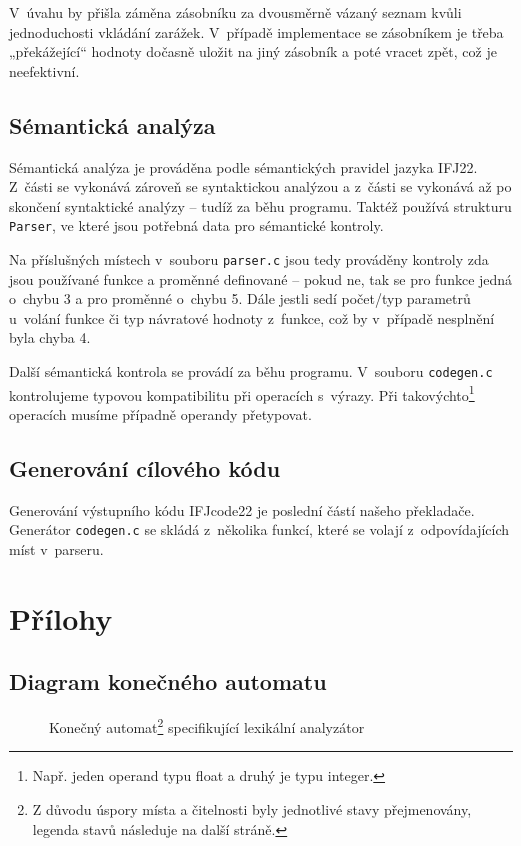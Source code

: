 \documentclass[a4paper,12pt]{article}
\begin{document}
V~úvahu by přišla záměna zásobníku za dvousměrně vázaný seznam kvůli jednoduchosti vkládání zarážek. V~případě implementace se zásobníkem je třeba „překážející“ hodnoty dočasně uložit na jiný zásobník a poté vracet zpět, což je neefektivní.

\subsection{Sémantická analýza}
Sémantická analýza je prováděna podle sémantických pravidel jazyka IFJ22. Z~části se vykonává zároveň se syntaktickou analýzou  a z~části se vykonává až po skončení syntaktické analýzy -- tudíž za běhu programu. Taktéž používá strukturu \verb|Parser|, ve které jsou potřebná data pro sémantické kontroly. 

Na příslušných místech v~souboru \verb|parser.c| jsou tedy prováděny kontroly zda jsou používané funkce a proměnné definované -- pokud ne, tak se pro funkce jedná o~chybu 3 a pro proměnné o~chybu 5. Dále jestli sedí počet/typ parametrů u~volání funkce či typ návratové hodnoty z~funkce, což by v~případě nesplnění byla chyba 4.

Další sémantická kontrola se provádí za běhu programu. V~souboru \verb|codegen.c| kontrolujeme typovou kompatibilitu při operacích s~výrazy. Při takovýchto\footnote{Např. jeden operand typu float a druhý je typu integer.} operacích musíme případně operandy přetypovat.

\subsection{Generování cílového kódu}
Generování výstupního kódu IFJcode22 je poslední částí našeho překladače. Generátor \verb|codegen.c| se skládá z~několika funkcí, které se volají z~odpovídajících míst v~parseru.

\clearpage

\section{Přílohy}

\subsection{Diagram konečného automatu}

\begin{figure}[htp!]
	\centerline{}
	\begin{minipage}{\textwidth}
		\vspace{1.5em}
		\caption{Konečný automat\protect\footnote[5]{Z důvodu úspory místa a čitelnosti byly jednotlivé stavy přejmenovány, legenda stavů následuje na další stráně.} specifikující lexikální analyzátor}
		\label{fig:DKA}
	\end{minipage}
\end{figure}
\end{document}
